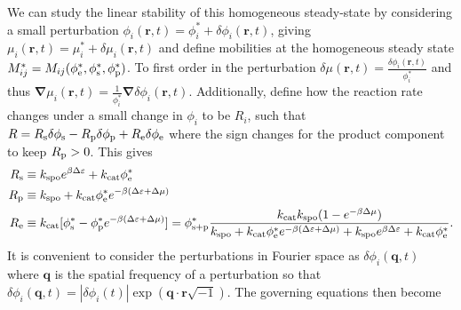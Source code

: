 We can study the linear stability of this homogeneous steady-state by considering a small perturbation $\phi_i(\bm{r},t) = \phi_i^* + \delta\phi_i(\bm{r}, t)$, giving $\mu_i(\bm{r},t) = \mu_i^* + \delta\mu_i(\bm{r},t)$ and define mobilities at the homogeneous steady state $M^*_{ij} = M_{ij}(\phi_{\mathrm{e}}^*, \phi_{\mathrm{s}}^*, \phi_{\mathrm{p}}^*)$. To first order in the perturbation $\delta\mu(\bm{r},t) = \frac{\delta\phi_i(\bm{r},t)}{\phi_i^*}$ and thus $\bm{\nabla}\mu_i(\bm{r},t) = \frac{1}{\phi_i^*}\bm{\nabla}\delta\phi_i(\bm{r},t)$. Additionally, define how the reaction rate changes under a small change in $\phi_i$ to be $R_i$, such that $R = R_\mathrm{s} \delta \phi_{\mathrm{s}} - R_\mathrm{p} \delta \phi_{\mathrm{p}} + R_\mathrm{e} \delta \phi_{\mathrm{e}}$ where the sign changes for the product component to keep $R_\mathrm{p} > 0$. This gives
\begin{align}
    R_\mathrm{s} &\equiv k_{\mathrm{spo}} e^{\beta \Delta \varepsilon} + k_{\mathrm{cat}}\phi_{\mathrm{e}}^* \\
    R_\mathrm{p} &\equiv k_{\mathrm{spo}} + k_{\mathrm{cat}}\phi_{\mathrm{e}}^*e^{-\beta (\Delta \varepsilon+\Delta \mu)} \\
    R_\mathrm{e} &\equiv k_\mathrm{cat} [ \phi_{\mathrm{s}}^* - \phi_{\mathrm{p}}^* e^{-\beta (\Delta \varepsilon + \Delta \mu)}] = \phi^*_\mathrm{s+p} \frac{k_\mathrm{cat} k_\mathrm{spo} (1-e^{-\beta \Delta \mu})}{k_\mathrm{spo} + k_\mathrm{cat} \phi_{\mathrm{e}}^* e^{-\beta (\Delta \varepsilon + \Delta \mu)} + k_\mathrm{spo} e^{\beta \Delta \varepsilon} + k_\mathrm{cat} \phi_{\mathrm{e}}^* }.
\end{align}
It is convenient to consider the perturbations in Fourier space as $\delta\phi_i (\bm{q},t)$ where $\bm{q}$ is the spatial frequency of a perturbation so that $\delta\phi_i (\bm{q},t) = |\delta\phi_i(t)|\exp\left(\bm{q}\cdot\bm{r}\sqrt{-1}\right)$. The governing equations then become
\newline
\newline
{}

